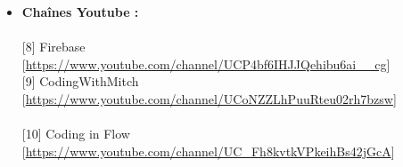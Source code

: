 \begin{itemize}
\vspace{1cm}
\\ \item \textbf{\Large{Chaînes Youtube :}}\\
\\{[8]} Firebase 
[\url{https://www.youtube.com/channel/UCP4bf6IHJJQehibu6ai__cg}]
\vspace{0.3cm}
\\{[9]} CodingWithMitch [\url{https://www.youtube.com/channel/UCoNZZLhPuuRteu02rh7bzsw}]\\
\\{[10]} Coding in Flow [\url{https://www.youtube.com/channel/UC_Fh8kvtkVPkeihBs42jGcA}]

\end{itemize}